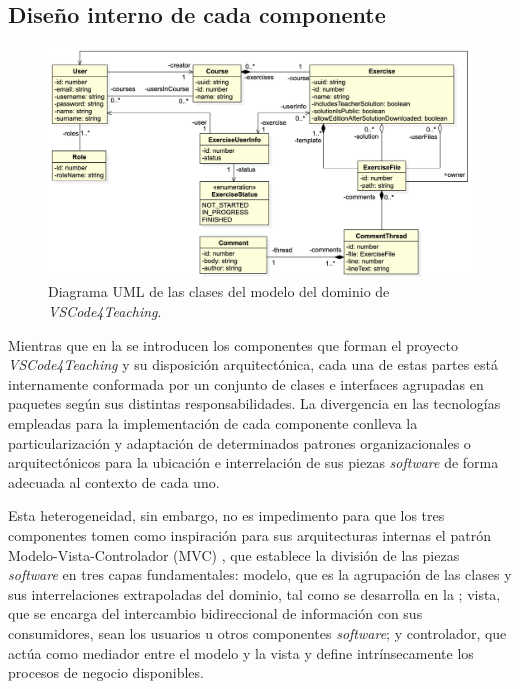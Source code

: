 \subsection{Diseño interno de cada componente}
\label{subsec:diseño}

\begin{figure}[ht]
    \centering
    \includegraphics[width=\textwidth]{imagenes/utilizadas/4-2-arquitectura/diagramas/diag2-modeloDominio.png}
    \caption{Diagrama UML de las clases del modelo del dominio de \textit{VSCode4Teaching}.}
    \label{fig:modeloDominio}
\end{figure}

Mientras que en la  se introducen los componentes que forman el proyecto \textit{VSCode4Teaching} y su disposición arquitectónica, cada una de estas partes está internamente conformada por un conjunto de clases e interfaces agrupadas en paquetes según sus distintas responsabilidades. La divergencia en las tecnologías empleadas para la implementación de cada componente conlleva la particularización y adaptación de determinados patrones organizacionales o arquitectónicos para la ubicación e interrelación de sus piezas \textit{software} de forma adecuada al contexto de cada uno.

Esta heterogeneidad, sin embargo, no es impedimento para que los tres componentes tomen como inspiración para sus arquitecturas internas el patrón Modelo-Vista-Controlador (MVC) \cite{MVC}, que establece la división de las piezas \textit{software} en tres capas fundamentales: modelo, que es la agrupación de las clases y sus interrelaciones extrapoladas del dominio, tal como se desarrolla en la ; vista, que se encarga del intercambio bidireccional de información con sus consumidores, sean los usuarios u otros componentes \textit{software}; y controlador, que actúa como mediador entre el modelo y la vista y define intrínsecamente los procesos de negocio disponibles.

